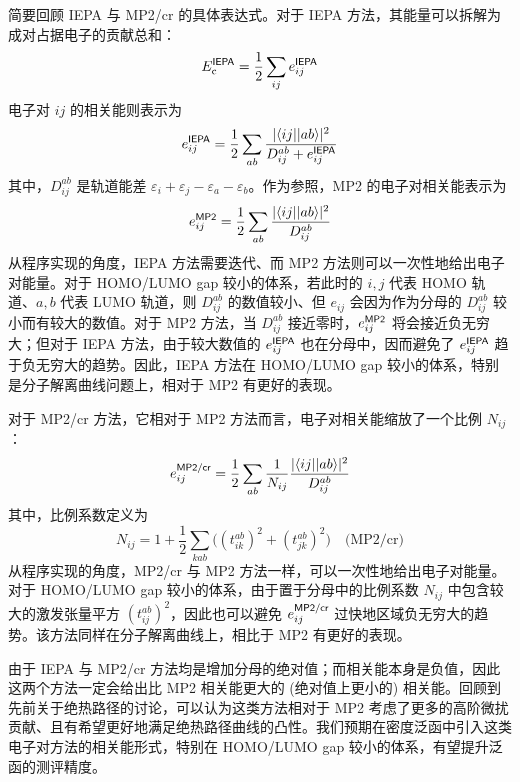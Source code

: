 简要回顾 IEPA 与 MP2/cr 的具体表达式。对于 IEPA 方法，其能量可以拆解为成对占据电子的贡献总和：
\begin{equation}
  E_\mathrm{c}^{\textsf{IEPA}} = \frac{1}{2} \sum_{ij} e_{ij}^{\textsf{IEPA}}
\end{equation}
电子对 $ij$ 的相关能则表示为
\begin{equation}
  e_{ij}^{\textsf{IEPA}} = \frac{1}{2} \sum_{ab} \frac{|\langle ij || ab \rangle|^2}{D_{ij}^{ab} + e_{ij}^{\textsf{IEPA}}}
\end{equation}
其中，$D_{ij}^{ab}$ 是轨道能差 $\varepsilon_i + \varepsilon_j - \varepsilon_a - \varepsilon_b$。作为参照，MP2 的电子对相关能表示为
\begin{equation}
  e_{ij}^{\textsf{MP2}} = \frac{1}{2} \sum_{ab} \frac{|\langle ij || ab \rangle|^2}{D_{ij}^{ab}}
\end{equation}
从程序实现的角度，IEPA 方法需要迭代、而 MP2 方法则可以一次性地给出电子对能量。对于 HOMO/LUMO gap 较小的体系，若此时的 $i, j$ 代表 HOMO 轨道、$a, b$ 代表 LUMO 轨道，则 $D_{ij}^{ab}$ 的数值较小、但 $e_{ij}$ 会因为作为分母的 $D_{ij}^{ab}$ 较小而有较大的数值。对于 MP2 方法，当 $D_{ij}^{ab}$ 接近零时，$e_{ij}^{\textsf{MP2}}$ 将会接近负无穷大；但对于 IEPA 方法，由于较大数值的 $e_{ij}^{\textsf{IEPA}}$ 也在分母中，因而避免了 $e_{ij}^{\textsf{IEPA}}$ 趋于负无穷大的趋势。因此，IEPA 方法在 HOMO/LUMO gap 较小的体系，特别是分子解离曲线问题上，相对于 MP2 有更好的表现\cite{Zhang-Scheffler.NJP.2016, Zhang-Scheffler.PRL.2016}。

对于 MP2/cr 方法，它相对于 MP2 方法而言，电子对相关能缩放了一个比例 $N_{ij}$：
\begin{equation}
  \label{eq.2.eij-MP2cr}
  e_{ij}^{\textsf{MP2/cr}} = \frac{1}{2} \sum_{ab} \frac{1}{N_{ij}} \frac{|\langle ij || ab \rangle|^2}{D_{ij}^{ab}}
\end{equation}
其中，比例系数定义为
\begin{equation}
  \label{eq.2.Nij-MP2cr}
  N_{ij} = 1 + \frac{1}{2} \sum_{kab} \big( (t_{ik}^{ab})^2 + (t_{jk}^{ab})^2 \big) \quad \text{(MP2/cr)}
\end{equation}
从程序实现的角度，MP2/cr 与 MP2 方法一样，可以一次性地给出电子对能量。对于 HOMO/LUMO gap 较小的体系，由于置于分母中的比例系数 $N_{ij}$ 中包含较大的激发张量平方 $(t_{ij}^{ab})^2$，因此也可以避免 $e_{ij}^{\textsf{MP2/cr}}$ 过快地区域负无穷大的趋势。该方法同样在分子解离曲线上，相比于 MP2 有更好的表现\cite{Dykstra-Davidson.IJQC.2000}。

由于 IEPA 与 MP2/cr 方法均是增加分母的绝对值；而相关能本身是负值，因此这两个方法一定会给出比 MP2 相关能更大的 (绝对值上更小的) 相关能。回顾到先前关于绝热路径的讨论，可以认为这类方法相对于 MP2 考虑了更多的高阶微扰贡献、且有希望更好地满足绝热路径曲线的凸性。我们预期在密度泛函中引入这类电子对方法的相关能形式，特别在 HOMO/LUMO gap 较小的体系，有望提升泛函的测评精度。

